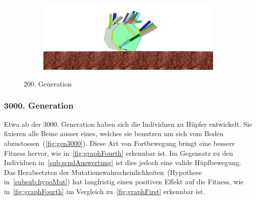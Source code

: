 \begin{figure}[H]
\begin{subfigure}[b]{0.45\textwidth}
            \includegraphics[width=\linewidth,center]{graphics/simulation-results/4_gen200_4}
            \caption{\label{fig:gen200_4}}
          \end{subfigure}
          \caption{200. Generation\label{fig:gen200}}
        \end{figure}

      \subsubsection{3000. Generation}

        Etwa ab der 3000. Generation haben sich die Individuen zu Hüpfer entwickelt.
        Sie fixieren alle Beine ausser eines, welches sie benutzen um sich vom Boden abzustossen~(\vref{fig:gen3000}).
        Diese Art von Fortbewegung bringt eine bessere Fitness hervor, wie in~\vref{fig:graphFourth} erkennbar ist.
        Im Gegensatz zu den Individuen in~\vref{sub:scndAuswertung} ist dies jedoch eine valide Hüpfbewegung.
        Das Herabsetzten der Mutationswahrscheinlichkeiten~(Hypothese in~\vref{subsub:hypoMut}) hat langfristig einen positiven Effekt auf die Fitness,
        wie in~\vref{fig:graphFourth} im Vergleich zu~\vref{fig:graphFirst} erkennbar ist.

        \vspace{0.5cm}


